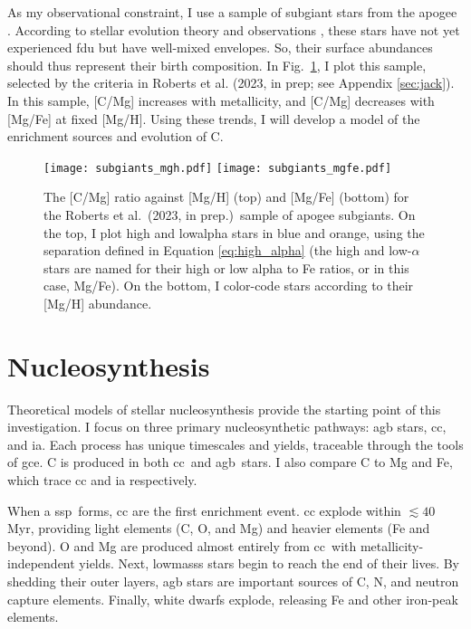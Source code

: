 \documentclass[12pt,oneside,letterpaper]{report}
\newcommand{\cc}{\gls{cc}}
\newcommand{\agb}{\gls{agb}}
\newcommand{\ia}{\gls{ia}}
\newcommand{\ssp}{\gls{ssp}}
\newcommand{\gce}{\gls{gce}}
\newcommand{\apogee}{\gls{apogee}}
\newcommand{\citetjack}{Roberts et al.~(2023, in prep.)}
\begin{document}
As my observational constraint, I use a sample of \gls{subgiant} stars from the \apogee{} \citep{apogee17}. According to stellar evolution theory and observations \citep{gilroy89, korn+07, lind+08, souto+18, souto19}, these stars have not yet experienced \gls{fdu} but have well-mixed envelopes. So, their surface abundances should thus represent their birth composition.  In Fig.~\ref{fig:subgiants}, I plot this sample, selected by the criteria in Roberts et al. (2023, in prep; see Appendix \ref{sec:jack}). In this sample, [C/Mg] increases with \gls{metallicity}, and [C/Mg] decreases with [Mg/Fe] at fixed [Mg/H]. Using these trends, I will develop a model of the enrichment sources and evolution of C.

\begin{figure}[htp]
    \centering
    \texttt{[image: subgiants\_mgh.pdf]}
    \quad\texttt{[image: subgiants\_mgfe.pdf]}
    \caption[Subgiant Abundances]{The [C/Mg] ratio against [Mg/H] (top) and [Mg/Fe] (bottom) for the \citetjack~sample of \apogee{} \gls{subgiant}s. On the top, I plot high and \gls{lowalpha} stars in blue and orange, using the separation defined in Equation \ref{eq:high_alpha} (the high and low-$\alpha$ stars are named for their high or low \gls{alpha} to Fe ratios, or in this case, Mg/Fe). On the bottom, I color-code stars according to their [Mg/H] abundance.}
    \label{fig:subgiants}
\end{figure}








\chapter{Nucleosynthesis}

Theoretical models of stellar \gls{nucleosynthesis} provide the starting point of this investigation. I focus on three primary nucleosynthetic pathways: \agb{} stars, \cc{}, and \ia. Each process has unique timescales and \glspl{yield}, traceable through the tools of \gce. C is produced in both \cc\ and \agb\ stars. I also compare C to Mg and Fe, which trace \cc{} and \ia{} respectively.

When a \ssp~forms, \cc{} are the first enrichment event. \Gls{cc}  explode within $\lesssim 40$\,Myr, providing light elements (C, O, and Mg) and heavier elements (Fe and beyond). O and Mg are produced almost entirely from \cc\ with metallicity-independent yields. Next, \glspl{lowmass} stars begin to reach the end of their lives. By shedding their outer layers, \agb{} stars are important sources of C, N, and neutron capture elements.  Finally, white dwarfs explode, releasing Fe and other iron-peak elements.
\end{document}
